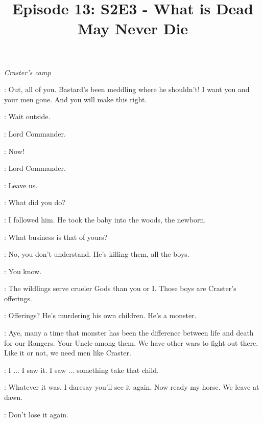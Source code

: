 

\title{Episode 13: S2E3 - What is Dead May Never Die}
\author{}
\date{}
\maketitle




\scene

\textit{Craster's camp} 

\CRASTER: Out, all of you. Bastard's been meddling where he shouldn't! I want you and your men gone. And you will make this right. 

\JEOR: Wait outside. 

\JON: Lord Commander. 

\JEOR: Now! 


\JON: Lord Commander. 

\JEOR: Leave us. 


\JEOR: What did you do? 

\JON: I followed him. He took the baby into the woods, the newborn. 

\JEOR: What business is that of yours? 

\JON: No, you don't understand. He's killing them, all the boys. 


\JON: You know. 

\JEOR: The wildlings serve crueler Gods than you or I. Those boys are Craster's offerings. 

\JON: Offerings? He's murdering his own children. He's a monster. 

\JEOR: Aye, many a time that monster has been the difference between life and death for our Rangers. Your Uncle among them. We have other wars to fight out there. Like it or not, we need men like Craster. 

\JON: I $\ldots$ I saw it. I saw $\ldots$ something take that child. 


\JEOR: Whatever it was, I daresay you'll see it again. Now ready my horse. We leave at dawn. 


\JEOR: Don't lose it again. 


